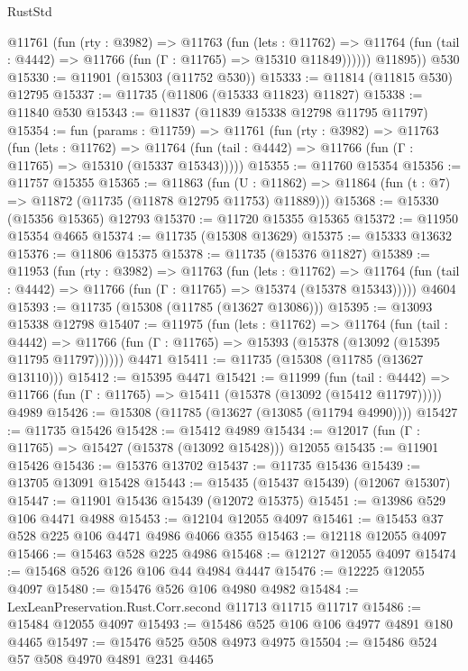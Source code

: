 \begin{lexlean}{RustStd}
\begin{coremodule}
          @11761
            (fun (rty : @3982) =>
            @11763
              (fun (lets : @11762) =>
              @11764 (fun (tail : @4442) => @11766 (fun (Γ : @11765) => @15310 @11849))))))
        @11895))
    @530
@15330 := @11901 (@15303 (@11752 @530))
@15333 := @11814 (@11815 @530) @12795
@15337 := @11735 (@11806 (@15333 @11823) @11827)
@15338 := @11840 @530
@15343 := @11837 (@11839 @15338 @12798 @11795 @11797)
@15354 := fun (params : @11759) =>
  @11761
    (fun (rty : @3982) =>
    @11763
      (fun (lets : @11762) =>
      @11764 (fun (tail : @4442) => @11766 (fun (Γ : @11765) => @15310 (@15337 @15343)))))
@15355 := @11760 @15354
@15356 := @11757 @15355
@15365 := @11863
    (fun (U : @11862) => @11864 (fun (t : @7) => @11872 (@11735 (@11878 @12795 @11753) @11889)))
@15368 := @15330 (@15356 @15365) @12793
@15370 := @11720 @15355 @15365
@15372 := @11950 @15354 @4665
@15374 := @11735 (@15308 @13629)
@15375 := @15333 @13632
@15376 := @11806 @15375
@15378 := @11735 (@15376 @11827)
@15389 := @11953
    (fun (rty : @3982) =>
    @11763
      (fun (lets : @11762) =>
      @11764 (fun (tail : @4442) => @11766 (fun (Γ : @11765) => @15374 (@15378 @15343)))))
    @4604
@15393 := @11735 (@15308 (@11785 (@13627 @13086)))
@15395 := @13093 @15338 @12798
@15407 := @11975
    (fun (lets : @11762) =>
    @11764
      (fun (tail : @4442) =>
      @11766 (fun (Γ : @11765) => @15393 (@15378 (@13092 (@15395 @11795 @11797))))))
    @4471
@15411 := @11735 (@15308 (@11785 (@13627 @13110)))
@15412 := @15395 @4471
@15421 := @11999
    (fun (tail : @4442) => @11766 (fun (Γ : @11765) => @15411 (@15378 (@13092 (@15412 @11797)))))
    @4989
@15426 := @15308 (@11785 (@13627 (@13085 (@11794 @4990))))
@15427 := @11735 @15426
@15428 := @15412 @4989
@15434 := @12017 (fun (Γ : @11765) => @15427 (@15378 (@13092 @15428))) @12055
@15435 := @11901 @15426
@15436 := @15376 @13702
@15437 := @11735 @15436
@15439 := @13705 @13091 @15428
@15443 := @15435 (@15437 @15439) (@12067 @15307)
@15447 := @11901 @15436 @15439 (@12072 @15375)
@15451 := @13986 @529 @106 @4471 @4988
@15453 := @12104 @12055 @4097
@15461 := @15453 @37 @528 @225 @106 @4471 @4986 @4066 @355
@15463 := @12118 @12055 @4097
@15466 := @15463 @528 @225 @4986
@15468 := @12127 @12055 @4097
@15474 := @15468 @526 @126 @106 @44 @4984 @4447
@15476 := @12225 @12055 @4097
@15480 := @15476 @526 @106 @4980 @4982
@15484 := LexLeanPreservation.Rust.Corr.second @11713 @11715 @11717
@15486 := @15484 @12055 @4097
@15493 := @15486 @525 @106 @106 @4977 @4891 @180 @4465
@15497 := @15476 @525 @508 @4973 @4975
@15504 := @15486 @524 @57 @508 @4970 @4891 @231 @4465

\end{coremodule}
\end{lexlean}
